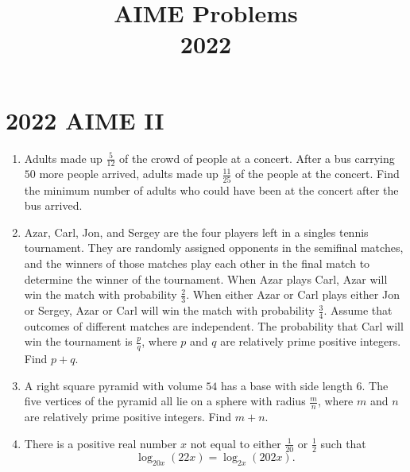 \documentclass{article}
\title{AIME Problems \\ 2022}
\date{}
\begin{document}
\maketitle\thispagestyle{fancy}\newpage\section*{2022 AIME II}\begin{enumerate}[label=\arabic*., itemsep=0.5em]\item Adults made up \(\frac5{12}\) of the crowd of people at a concert. After a bus carrying \(50\) more people arrived, adults made up \(\frac{11}{25}\) of the people at the concert. Find the minimum number of adults who could have been at the concert after the bus arrived.\par \vspace{0.5em}\item Azar, Carl, Jon, and Sergey are the four players left in a singles tennis tournament. They are randomly assigned opponents in the semifinal matches, and the winners of those matches play each other in the final match to determine the winner of the tournament. When Azar plays Carl, Azar will win the match with probability \(\frac23\). When either Azar or Carl plays either Jon or Sergey, Azar or Carl will win the match with probability \(\frac34\). Assume that outcomes of different matches are independent. The probability that Carl will win the tournament is \(\frac{p}{q}\), where \(p\) and \(q\) are relatively prime positive integers. Find \(p+q\).\par \vspace{0.5em}\item A right square pyramid with volume \(54\) has a base with side length \(6.\) The five vertices of the pyramid all lie on a sphere with radius \(\frac mn\), where \(m\) and \(n\) are relatively prime positive integers. Find \(m+n\).\par \vspace{0.5em}\item There is a positive real number \(x\) not equal to either \(\tfrac{1}{20}\) or \(\tfrac{1}{2}\) such that
\begin{equation*}
\log_{20x} (22x)=\log_{2x} (202x).
\end{equation*}

\end{enumerate}
\end{document}
